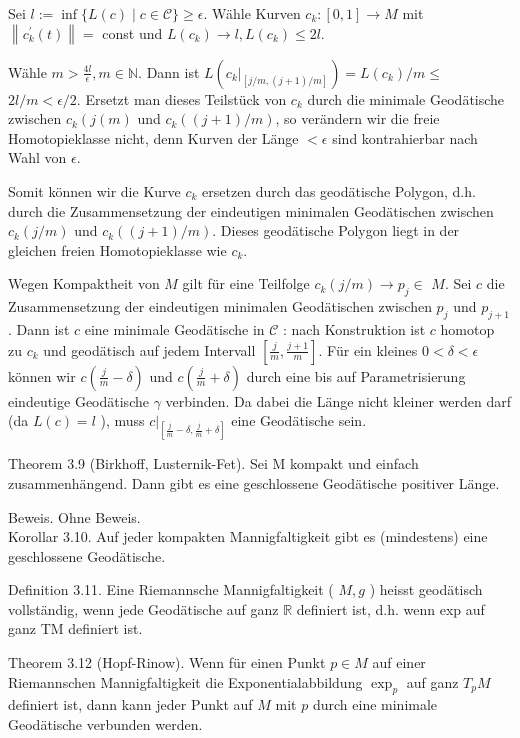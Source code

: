 \documentclass[10pt]{article}
\begin{document}
Sei $l:=\inf \{L(c) \mid c \in \mathcal{C}\} \geq \epsilon$. Wähle Kurven $c_{k}:[0,1] \rightarrow M$ mit $\left\|c_{k}^{\prime}(t)\right\|=$ const und $L\left(c_{k}\right) \rightarrow l, L\left(c_{k}\right) \leq 2 l$.

Wähle $m>\frac{4 l}{\epsilon}, m \in \mathbb{N}$. Dann ist $L\left(\left.c_{k}\right|_{[j / m,(j+1) / m]}\right)=L\left(c_{k}\right) / m \leq$ $2 l / m<\epsilon / 2$. Ersetzt man dieses Teilstück von $c_{k}$ durch die minimale Geodätische zwischen $c_{k}\left(j(m)\right.$ und $c_{k}((j+1) / m)$, so verändern wir die freie Homotopieklasse nicht, denn Kurven der Länge $<\epsilon$ sind kontrahierbar nach Wahl von $\epsilon$.

Somit können wir die Kurve $c_{k}$ ersetzen durch das geodätische Polygon, d.h. durch die Zusammensetzung der eindeutigen minimalen Geodätischen zwischen $c_{k}(j / m)$ und $c_{k}((j+1) / m)$. Dieses geodätische Polygon liegt in der gleichen freien Homotopieklasse wie $c_{k}$.

Wegen Kompaktheit von $M$ gilt für eine Teilfolge $c_{k}(j / m) \rightarrow p_{j} \in$ $M$. Sei $c$ die Zusammensetzung der eindeutigen minimalen Geodätischen zwischen $p_{j}$ und $p_{j+1}$. Dann ist $c$ eine minimale Geodätische in $\mathcal{C}$ : nach Konstruktion ist $c$ homotop zu $c_{k}$ und geodätisch auf jedem Intervall $\left[\frac{j}{m}, \frac{j+1}{m}\right]$. Für ein kleines $0<\delta<\epsilon$ können wir $c\left(\frac{j}{m}-\delta\right)$ und $c\left(\frac{j}{m}+\delta\right)$ durch eine bis auf Parametrisierung eindeutige Geodätische $\gamma$ verbinden. Da dabei die Länge nicht kleiner werden darf (da $L(c)=l$ ), muss $\left.c\right|_{\left[\frac{j}{m}-\delta, \frac{j}{m}+\delta\right]}$ eine Geodätische sein.

Theorem 3.9 (Birkhoff, Lusternik-Fet). Sei M kompakt und einfach zusammenhängend. Dann gibt es eine geschlossene Geodätische positiver Länge.

Beweis. Ohne Beweis.\\
Korollar 3.10. Auf jeder kompakten Mannigfaltigkeit gibt es (mindestens) eine geschlossene Geodätische.

Definition 3.11. Eine Riemannsche Mannigfaltigkeit ( $M, g$ ) heisst geodätisch vollständig, wenn jede Geodätische auf ganz $\mathbb{R}$ definiert ist, d.h. wenn exp auf ganz TM definiert ist.

Theorem 3.12 (Hopf-Rinow). Wenn für einen Punkt $p \in M$ auf einer Riemannschen Mannigfaltigkeit die Exponentialabbildung $\exp _{p}$ auf ganz $T_{p} M$ definiert ist, dann kann jeder Punkt auf $M$ mit $p$ durch eine minimale Geodätische verbunden werden.
\end{document}
